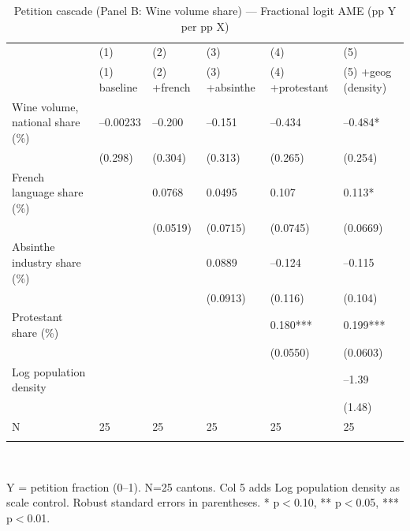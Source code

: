 \begin{table}[tbp] \centering
{}

\caption{Petition cascade (Panel B: Wine volume share) --- Fractional logit AME (pp Y per pp X)}
\label{tab:T4_X2_FL}
\begin{tabularx}{\linewidth}{@{}lCCCCC@{}}

\toprule
&{(1)}&{(2)}&{(3)}&{(4)}&{(5)} \tabularnewline
 & (1) baseline & (2) +french & (3) +absinthe & (4) +protestant & (5) +geog (density) \tabularnewline 
\midrule \addlinespace[\belowrulesep]
Wine volume, national share (\%)&--0.00233&--0.200&--0.151&--0.434&--0.484* \tabularnewline
&(0.298)&(0.304)&(0.313)&(0.265)&(0.254) \tabularnewline
French language share (\%)&&0.0768&0.0495&0.107&0.113* \tabularnewline
&&(0.0519)&(0.0715)&(0.0745)&(0.0669) \tabularnewline
Absinthe industry share (\%)&&&0.0889&--0.124&--0.115 \tabularnewline
&&&(0.0913)&(0.116)&(0.104) \tabularnewline
Protestant share (\%)&&&&0.180***&0.199*** \tabularnewline
&&&&(0.0550)&(0.0603) \tabularnewline
Log population density&&&&&--1.39 \tabularnewline
&&&&&(1.48) \tabularnewline
\midrule N&25&25&25&25&25 \tabularnewline
\bottomrule \addlinespace[\belowrulesep]

\end{tabularx}
\\ \parbox{\linewidth}{\footnotesize Y = petition fraction (0--1). N=25 cantons. Col 5 adds Log population density as scale control. Robust standard errors in parentheses. * p\(<\)0.10, ** p\(<\)0.05, *** p\(<\)0.01.}
\end{table}
